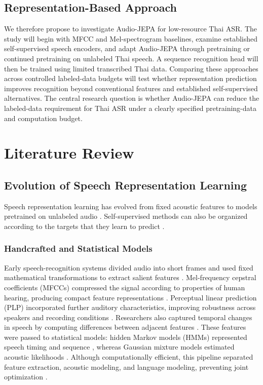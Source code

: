\documentclass[conference]{IEEEtran}
\begin{document}
\subsection{Representation-Based Approach}
We therefore propose to investigate Audio-JEPA for low-resource Thai ASR. The study will begin with MFCC and Mel-spectrogram baselines, examine established self-supervised speech encoders, and adapt Audio-JEPA through pretraining or continued pretraining on unlabeled Thai speech. A sequence recognition head will then be trained using limited transcribed Thai data. Comparing these approaches across controlled labeled-data budgets will test whether representation prediction improves recognition beyond conventional features and established self-supervised alternatives. The central research question is whether Audio-JEPA can reduce the labeled-data requirement for Thai ASR under a clearly specified pretraining-data and computation budget.

\section{Literature Review}

\subsection{Evolution of Speech Representation Learning}

Speech representation learning has evolved from fixed acoustic features to models pretrained on unlabeled audio \cite{gales2008hmm,hinton2012dnn,baevski2020wav2vec2}. Self-supervised methods can also be organized according to the targets that they learn to predict \cite{liu2021tera,baevski2020wav2vec2,hsu2021hubert,chen2022wavlm,baevski2022data2vec}.

\subsubsection{Handcrafted and Statistical Models}

Early speech-recognition systems divided audio into short frames and used fixed mathematical transformations to extract salient features \cite{davis1980mfcc,hermansky1990plp,rabiner1989hmm,gales2008hmm}. Mel-frequency cepstral coefficients (MFCCs) compressed the signal according to properties of human hearing, producing compact feature representations \cite{davis1980mfcc}. Perceptual linear prediction (PLP) incorporated further auditory characteristics, improving robustness across speakers and recording conditions \cite{hermansky1990plp}. Researchers also captured temporal changes in speech by computing differences between adjacent features \cite{davis1980mfcc,hermansky1990plp}. These features were passed to statistical models: hidden Markov models (HMMs) represented speech timing and sequence \cite{rabiner1989hmm}, whereas Gaussian mixture models estimated acoustic likelihoods \cite{gales2008hmm}. Although computationally efficient, this pipeline separated feature extraction, acoustic modeling, and language modeling, preventing joint optimization \cite{rabiner1989hmm,gales2008hmm}.
\end{document}
